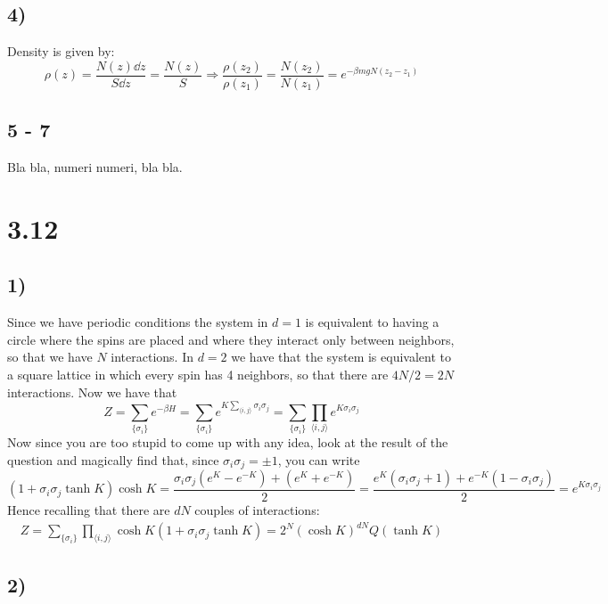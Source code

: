 \documentclass[10pt,a4paper]{book}
\begin{document}
\subsection*{4)}
Density is given by:
\[
\rho(z) = \frac{N(z) \dd z}{S \dd z} = \frac{N(z)}{S} \Rightarrow \frac{\rho(z_2)}{\rho(z_1)} = \frac{N(z_2)}{N(z_1)} = e^{-\beta m g N (z_2 - z_1)}
\]

\subsection*{5 - 7}
Bla bla, numeri numeri, bla bla.





\section*{3.12}

\subsection*{1)}
Since we have periodic conditions the system in $d=1$ is equivalent to having a circle where the spins are placed and where they interact only between neighbors, so that we have $N$ interactions. In $d=2$ we have that the system is equivalent to a square lattice in which every spin has 4 neighbors, so that there are $4N/2=2N$ interactions.
Now we have that
$$Z=\sum_{\{\sigma_i\}}e^{-\beta H}=\sum_{\{\sigma_i\}}e^{K\sum_{\langle i,j\rangle} \sigma_i\sigma_j}=\sum_{\{\sigma_i\}}\prod_{\langle i,j\rangle}e^{K\sigma_i\sigma_j}
$$
Now since you are too stupid to come up with any idea, look at the result of the question and magically find that, since $\sigma_i\sigma_j=\pm 1$, you can write 
$$(1+\sigma_i\sigma_j\tanh K)\cosh K=\frac{\sigma_i\sigma_j(e^K-e^{-K})+(e^K+e^{-K})}{2}=\frac{e^K(\sigma_i\sigma_j+1)+e^{-K}(1-\sigma_i\sigma_j)}{2}=e^{K\sigma_i\sigma_j}$$
Hence recalling that there are $dN$ couples of interactions:
\begin{align*}
Z=\sum_{\{\sigma_i\}}\prod_{\langle i,j\rangle}\cosh K(1+\sigma_i\sigma_j\tanh K)=2^N(\cosh K)^{dN}Q(\tanh K)
\end{align*}


\subsection*{2)}
\end{document}
